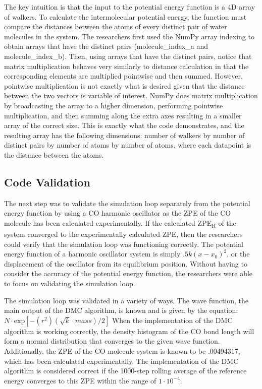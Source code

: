 \documentclass[journal=jacsat,manuscript=article]{achemso}
\begin{document}
The key intuition is that the input to the potential energy function is a 4D array of walkers. To calculate the intermolecular potential energy, the function must compare the distances between the atoms of every distinct pair of water molecules in the system. The researchers first used the NumPy array indexing to obtain arrays that have the distinct pairs (molecule\_index\_a and molecule\_index\_b). Then, using arrays that have the distinct pairs, notice that matrix multiplication behaves very similarly to distance calculation in that the corresponding elements are multiplied pointwise and then summed. However, pointwise multiplication is not exactly what is desired given that the distance between the two vectors is variable of interest. NumPy does matrix multiplication by broadcasting the array to a higher dimension, performing pointwise multiplication, and then summing along the extra axes resulting in a smaller array of the correct size. This is exactly what the code demonstrates, and the resulting array has the following dimensions: number of walkers by number of distinct pairs by number of atoms by number of atoms, where each datapoint is the distance between the atoms.

\subsection{Code Validation}

The next step was to validate the simulation loop separately from the potential energy function by using a CO harmonic oscillator as the ZPE of the CO molecule has been calculated experimentally. If the calculated ZPE\textsubscript{R} of the system converged to the experimentally calculated ZPE, then the researchers could verify that the simulation loop was functioning correctly. The potential energy function of a harmonic oscillator system is simply $.5k(x-x_0)^2$, or the displacement of the oscillator from its equilibrium position. Without having to consider the accuracy of the potential energy function, the researchers were able to focus on validating the simulation loop. 
	
The simulation loop was validated in a variety of ways. The wave function, the main output of the DMC algorithm, is known and is given by the equation: $N\cdot \text{exp}[-(r^2)(\sqrt k\cdot mass)/2]$ When the implementation of the DMC algorithm is working correctly, the density histogram of the CO bond length will form a normal distribution that converges to the given wave function. Additionally, the ZPE of the CO molecule system is known to be .00494317, which has been calculated experimentally. The implementation of the DMC algorithm is considered correct if the 1000-step rolling average of the reference energy converges to this ZPE within the range of $1\cdot10^{-4}$. 
	
\end{document}
